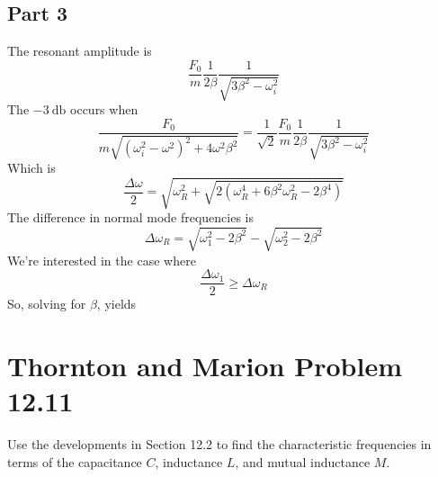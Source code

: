 \subsection{Part 3}
The resonant amplitude is
\begin{equation}
    \frac{F_0}{m}\frac{1}{2\beta}\frac{1}{\sqrt{3\beta^2-\omega_i^2}}
\end{equation}
The $\SI{-3}{\decibel}$ occurs when
\begin{equation}
    \frac{F_0}{m\sqrt{(\omega_i^2-\omega^2)^2+4\omega^2 \beta^2}} = \frac{1}{\sqrt{2}}\frac{F_0}{m}\frac{1}{2\beta}\frac{1}{\sqrt{3\beta^2-\omega_i^2}}
\end{equation}
Which is
\begin{equation}
    \frac{\Delta \omega}{2} = \sqrt{\omega_R^2 +\sqrt{2(\omega_R^4+6\beta^2\omega_R^2-2\beta^4)}}
\end{equation}
The difference in normal mode frequencies is
\begin{equation}
    \Delta \omega_R = \sqrt{\omega_1^2-2\beta^2}-\sqrt{\omega_2^2-2\beta^2}
\end{equation}
We're interested in the case where
\begin{equation}
    \frac{\Delta \omega_1}{2} \geq \Delta \omega_R
\end{equation}
So, solving for $\beta$, yields
\begin{equation}
    
\end{equation}



\pagebreak
\section{Thornton and Marion Problem 12.11}
Use the developments in Section 12.2 to find the characteristic frequencies in terms of the capacitance $C$, inductance $L$, and mutual inductance $M$.

